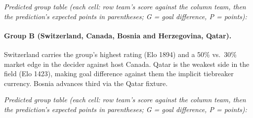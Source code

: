 \documentclass[11pt,letterpaper]{article}
\begin{document}
\noindent\textit{\footnotesize Predicted group table (each cell: row team's score against the column team, then the prediction's expected points in parentheses; G = goal difference, P = points):}



\paragraph{Group B (Switzerland, Canada, Bosnia and Herzegovina, Qatar).} Switzerland carries the group's highest rating (Elo 1894) and a 50\% vs.\ 30\% market edge in the decider against host Canada. Qatar is the weakest side in the field (Elo 1423), making goal difference against them the implicit tiebreaker currency. Bosnia advances third via the Qatar fixture.

\noindent\textit{\footnotesize Predicted group table (each cell: row team's score against the column team, then the prediction's expected points in parentheses; G = goal difference, P = points):}
\end{document}
